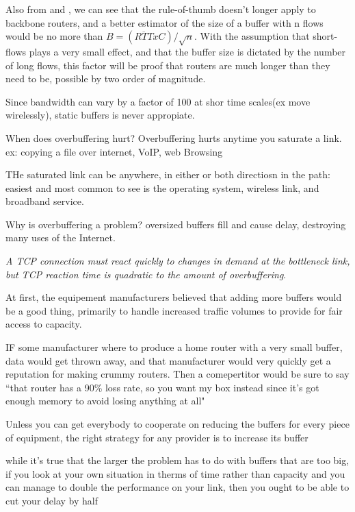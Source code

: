 Also from \cite{main:ref:1} and \cite{Vu-Brugier}, we can see that the rule-of-thumb doesn't longer apply to backbone routers, and a better estimator of the size of a buffer with n flows would be no more than $B = (\overline{RTT}xC)/\sqrt{n}$. With the assumption that short-flows plays a very small effect, and that the buffer size is dictated by the number of long flows, this factor will be proof that routers are much longer than they need to be, possible by two order of magnitude.


Since bandwidth can vary by a factor of 100 at shor time scales(ex move wirelessly), static buffers is never appropiate.

When does overbuffering hurt? Overbuffering hurts anytime you saturate a link. ex: copying a file over internet, VoIP, web Browsing

THe saturated link can be anywhere, in either or both directiosn in the path: easiest and most common to see is the operating system, wireless link, and broadband service.

Why is overbuffering a problem? oversized buffers fill and cause delay, destroying many uses of the Internet.

\textit{A TCP connection must react quickly to changes in demand at the bottleneck link, but TCP reaction time is quadratic to the amount of overbuffering}\cite{GettysNichols}.


At first, the equipement manufacturers believed that adding more buffers would be a good thing, primarily to handle increased traffic volumes to provide for fair access to capacity.

IF some manufacturer where to produce a home router with a very small buffer, data would get thrown away, and that manufacturer would very quickly get a reputation for making crummy routers. Then a comepertitor would be sure to say ``that router has a 90\% loss rate, so you want my box instead since it's got enough memory to avoid losing anything at all"

Unless you can get everybody to cooperate on reducing the buffers for every piece of equipment, the right strategy for any provider is to increase its buffer



while it's true that the larger the problem has to do with buffers that are too big, if you look at your own situation in therms of time rather than capacity and you can manage to double the performance on your link, then you ought to be able to cut your delay by half
